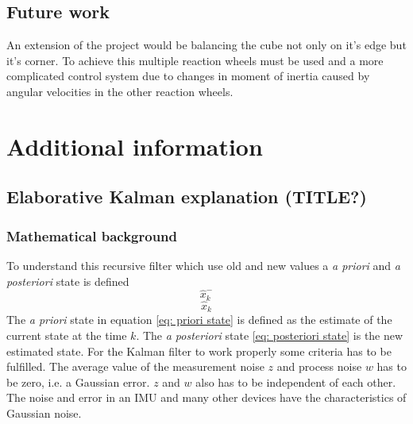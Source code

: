 \documentclass[a4paper,11pt]{kth-mag}
\begin{document}
\section{Future work}
An extension of the project would be balancing the cube not only on it's edge but it's corner. To achieve this multiple reaction wheels must be used and a more complicated control system due to changes in moment of inertia caused by angular velocities in the other reaction wheels.

%
\cleardoublepage


\cleardoublepage
\appendix
{}


\chapter{Additional information} \label{appA}
\section{Elaborative Kalman explanation (TITLE?)} \label{app: Kalman}
\subsection{Mathematical background}
To understand this recursive filter which use old and new values a \textit{a priori} and \textit{a posteriori} state is defined
\begin{equation} \label{eq: priori state}
\hat{x}^-_k
\end{equation}
\begin{equation} \label{eq: posteriori state}
\hat{x}_k
\end{equation}
The \textit{a priori}  state in equation \eqref{eq: priori state} is defined as the estimate of the current state at the time $k$. The \textit{a posteriori} state \eqref{eq: posteriori state} is the new estimated state.
For the Kalman filter to work properly some criteria has to be fulfilled. The average value of the measurement noise $z$ and process noise $w$ has to be zero, i.e. a Gaussian error. $z$ and $w$ also has to be independent of  each other. The noise and error in an IMU and many other devices have the characteristics of Gaussian noise.
\end{document}

